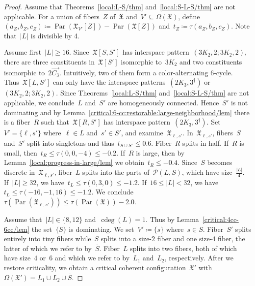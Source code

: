 \documentclass[english,a4paper]{article}
\theoremstyle{plain}
\theoremstyle{definition}
\newcommand{\abs}[1]{| #1 |}
\newcommand{\coherentConfig}{\ensuremath{\mathfrak{X}}}
\newcommand{\interspace}[2]{\ensuremath{\coherentConfig[#1,#2]}}
\newcommand{\inducedCC}[1]{\ensuremath{\coherentConfig[#1]}}
\newcommand{\vertices}{\ensuremath{\Omega}}
\DeclareMathOperator{\ColorDeg}{cdeg}
\newcommand{\colorDeg}[1]{\ensuremath{\ColorDeg\left(#1\right)}}
\newcommand{\equivalenceClasses}[1]{\ensuremath{\mathcal{P}(#1)}}
\DeclareMathOperator{\parameters}{Par}
\newcommand{\ipsixMatchingMatching}     {\ensuremath{(\disjointCliques{3}{2},2;\disjointCliques{3}{2},2)}}
\newcommand{\ipsixTriangle}               {\ensuremath{(\disjointCliques{2}{3},3^\dag)}}
\newcommand{\clique}[1]{\ensuremath{K_{#1}}}
\newcommand{\disjointCliques}[2]{\ensuremath{#1 \clique{#2}}}
\begin{document}
\begin{proof}
    Assume that Theorems~\ref{local:L-S/thm} and~\ref{local:S-L-S/thm} are not applicable.
    For a union of fibers~$Z$ of~$\coherentConfig$ and~$V' \subseteq \vertices(\coherentConfig)$, define~$(a_Z,b_Z,c_Z) \coloneqq \parameters(\coherentConfig_{V'}[Z]) - \parameters(\coherentConfig[Z])$ and~$t_Z \coloneqq \tau(a_Z,b_Z,c_Z)$. Note that~$|L|$ is divisible by 4.

    Assume first~$\abs{L}\geq 16$.
    Since~$\interspace{S}{S'}$ has interspace pattern~$\ipsixMatchingMatching$, there are three constituents in~$\inducedCC{S'}$ isomorphic to~$\disjointCliques{3}{2}$ and two constituents isomorphic to~$2\overrightarrow{C_3}$.
    Intuitively, two of them form a color-alternating $6$-cycle.
    Thus~$\interspace{L}{S'}$ can only have the interspace patterns~$\ipsixTriangle$ or~$\ipsixMatchingMatching$.
    Since Theorems~\ref{local:L-S/thm} and~\ref{local:S-L-S/thm} are not applicable, we conclude~$L$ and~$S'$ are homogeneously connected.
    Hence~$S'$ is not dominating and by Lemma~\ref{critical:6-cc:restorable:large-neighborhood/lem} there is a fiber~$R$ such that~$\interspace{R}{S'}$ has interspace pattern~$\ipsixTriangle$.
    Set~$V' = \{\ell,s'\}$ where~$\ell \in L$ and~$s' \in S'$, and examine~$\coherentConfig_{\ell,s'}$.
    In~$\coherentConfig_{\ell,s'}$, fibers~$S$ and~$S'$ split into singletons and thus~$t_{S\cup S'} \leq 0.6$.
    Fiber~$R$ splits in half.
    If~$R$ is small, then~$t_R \leq \tau(0,0,-4) \leq -0.2$.
    If~$R$ is large, then by Lemma~\ref{local:progress-in-large/lem} we obtain~$t_R \leq -0.4$.
    Since~$S$ becomes discrete in~$\coherentConfig_{\ell,s'}$, fiber~$L$ splits into the parts of~$\equivalenceClasses{L,S}$, which have size~$\frac{|L|}{4}$.
    If~$|L| \geq 32$, we have~$t_{L} \leq \tau(0,3,0) \leq -1.2$.
    If~$16 \leq |L| < 32$, we have~$t_L \leq \tau(-16,-1,16) \leq -1.2$.
    We conclude~$\tau(\parameters(\coherentConfig_{\ell,s'})) \leq \tau(\parameters(\coherentConfig)) - 2.0$.

    Assume that~$\abs{L} \in \{8,12\}$ and~$\colorDeg{L} = 1$.
    Thus by Lemma~\ref{critical:4cc-6cc/lem} the set~$\{S\}$ is dominating.
    We set~$V' \coloneqq \{s\}$ where~$s \in S$.
    Fiber~$S'$ splits entirely into tiny fibers while~$S$ splits into a size-$2$ fiber and one size-$4$ fiber, the latter of which we refer to by~$\overline{S}$.
    Fiber~$L$ splits into two fibers, both of which have size~$4$ or~$6$ and which we refer to by~$L_1$ and~$L_2$, respectively.
    After we restore criticality, we obtain a critical coherent configuration~$\coherentConfig'$ with~$\vertices(\coherentConfig') = L_1 \cup L_2 \cup \overline{S}$.


\end{proof}
\end{document}
